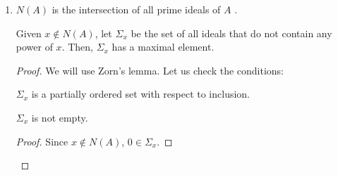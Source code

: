 \begin{problem}
\begin{enumerate}[label=(\theproblem.\arabic*),ref=\theproblem.\arabic*]
\begin{sol}
            \begin{proof}
                Let $I \subset A$ be a prime ideal.
                Let $x \in N(A)$.
                Then, $x^n = 0 \in I$ for some $n \in \mathbb{N}$.
                Let us show by induction on $n$ that this implies $x \in I$:
                \begin{itemize}
                    \item If $n=1$, then $x = 0 \in I$.
                    \item Suppose that the statement is true for $n-1$: $x^{n-1} = 0 \imp x \in I$.
                    If $0 = x^n = x \cdot x^{n-1}$,
                    since $I$ is prime, $x \in I$ or $x^{n-1} \in I$.
                    In the first case, we are done.
                    The second case is just the inductive hypothesis.
                \end{itemize}
            \end{proof}
            \end{sol}

        \item $N(A)$ is the intersection of all prime ideals of $A$ .
            \begin{sol}
                \begin{claim}
                    Given $x \notin N(A)$, let $\varSigma_x$ be the set of all ideals that do not contain any power of $x$.
                    Then, $\varSigma_x$ has a maximal element.
                    \begin{proof}

                        We will use Zorn's lemma.
                        Let us check the conditions:

                        \begin{claim}
                              $\varSigma_x$ is a partially ordered set with respect to inclusion.
                        \end{claim}

                        \begin{claim}
                            $\varSigma_x$ is not empty.
                            \begin{proof}
                                Since $x \notin N(A)$, ${0} \in \varSigma_x$.
                            \end{proof}
                        \end{claim}


\end{proof}
\end{claim}
\end{sol}
\end{enumerate}
\end{problem}
